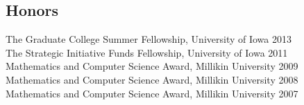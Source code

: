 \documentclass[line,margin]{res}
\begin{document}
\begin{resume}
                  \section{Honors}
                  The Graduate College Summer Fellowship, University of Iowa    \hfill 2013\\
                  The Strategic Initiative Funds Fellowship, University of Iowa \hfill 2011\\
                  Mathematics and Computer Science Award, Millikin University   \hfill 2009  \\
		  Mathematics and Computer Science Award, Millikin University   \hfill 2008  \\
		  Mathematics and Computer Science Award, Millikin University   \hfill 2007  \\
\end{resume}
\end{document}
